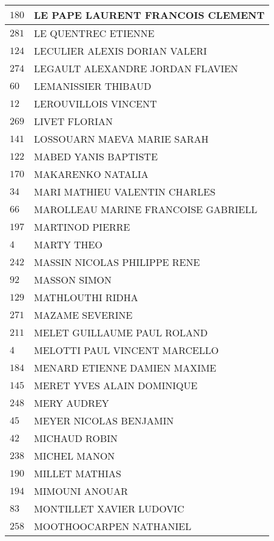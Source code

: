 \begin{xltabular}{\linewidth}{|l|X|}
    \hline
    $180$ & LE PAPE LAURENT FRANCOIS CLEMENT \\
    \hline
    $281$ & LE QUENTREC ETIENNE \\
    \hline
    $124$ & LECULIER ALEXIS DORIAN VALERI \\
    \hline
    $274$ & LEGAULT ALEXANDRE JORDAN FLAVIEN \\
    \hline
    $60$ & LEMANISSIER THIBAUD \\
    \hline
    $12$ & LEROUVILLOIS VINCENT \\
    \hline
    $269$ & LIVET FLORIAN \\
    \hline
    $141$ & LOSSOUARN MAEVA MARIE SARAH \\
    \hline
    $122$ & MABED YANIS BAPTISTE \\
    \hline
    $170$ & MAKARENKO NATALIA \\
    \hline
    $34$ & MARI MATHIEU VALENTIN CHARLES \\
    \hline
    $66$ & MAROLLEAU MARINE FRANCOISE GABRIELL \\
    \hline
    $197$ & MARTINOD PIERRE \\
    \hline
    $4$ & MARTY THEO \\
    \hline
    $242$ & MASSIN NICOLAS PHILIPPE RENE \\
    \hline
    $92$ & MASSON SIMON \\
    \hline
    $129$ & MATHLOUTHI RIDHA \\
    \hline
    $271$ & MAZAME SEVERINE \\
    \hline
    $211$ & MELET GUILLAUME PAUL ROLAND \\
    \hline
    $4$ & MELOTTI PAUL VINCENT MARCELLO \\
    \hline
    $184$ & MENARD ETIENNE DAMIEN MAXIME \\
    \hline
    $145$ & MERET YVES ALAIN DOMINIQUE \\
    \hline
    $248$ & MERY AUDREY \\
    \hline
    $45$ & MEYER NICOLAS BENJAMIN \\
    \hline
    $42$ & MICHAUD ROBIN \\
    \hline
    $238$ & MICHEL MANON \\
    \hline
    $190$ & MILLET MATHIAS \\
    \hline
    $194$ & MIMOUNI ANOUAR \\
    \hline
    $83$ & MONTILLET XAVIER LUDOVIC \\
    \hline
    $258$ & MOOTHOOCARPEN NATHANIEL \\

\end{xltabular}
